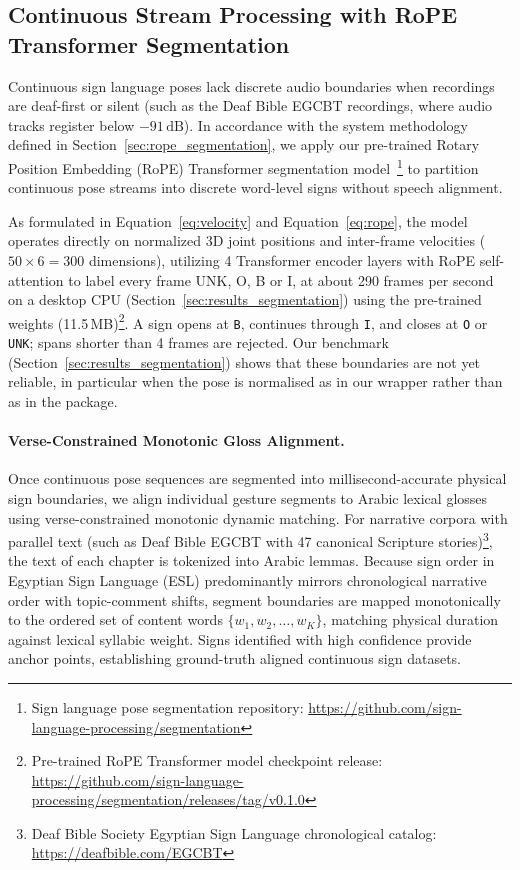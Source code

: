 \subsection{Continuous Stream Processing with RoPE Transformer Segmentation}
Continuous sign language poses lack discrete audio boundaries when recordings are deaf-first or silent (such as the Deaf Bible EGCBT recordings, where audio tracks register below $-91\,\text{dB}$). In accordance with the system methodology defined in Section~\ref{sec:rope_segmentation}, we apply our pre-trained Rotary Position Embedding (RoPE) Transformer segmentation model~\cite{signsegmentation}\footnote{Sign language pose segmentation repository: \url{https://github.com/sign-language-processing/segmentation}} to partition continuous pose streams into discrete word-level signs without speech alignment.

As formulated in Equation~\eqref{eq:velocity} and Equation~\eqref{eq:rope}, the model operates directly on normalized 3D joint positions and inter-frame velocities ($50 \times 6 = 300$ dimensions), utilizing 4 Transformer encoder layers with RoPE self-attention to label every frame UNK, O, B or I, at about 290 frames per second on a desktop CPU (Section~\ref{sec:results_segmentation}) using the pre-trained  weights (11.5\,MB)\footnote{Pre-trained RoPE Transformer model checkpoint release: \url{https://github.com/sign-language-processing/segmentation/releases/tag/v0.1.0}}. A sign opens at \texttt{B}, continues through \texttt{I}, and closes at \texttt{O} or \texttt{UNK}; spans shorter than 4 frames are rejected. Our benchmark (Section~\ref{sec:results_segmentation}) shows that these boundaries are not yet reliable, in particular when the pose is normalised as in our wrapper rather than as in the package.

\paragraph{Verse-Constrained Monotonic Gloss Alignment.}
Once continuous pose sequences are segmented into millisecond-accurate physical sign boundaries, we align individual gesture segments to Arabic lexical glosses using verse-constrained monotonic dynamic matching. For narrative corpora with parallel text (such as Deaf Bible EGCBT with 47 canonical Scripture stories)\footnote{Deaf Bible Society Egyptian Sign Language chronological catalog: \url{https://deafbible.com/EGCBT}}, the text of each chapter is tokenized into Arabic lemmas. Because sign order in Egyptian Sign Language (ESL) predominantly mirrors chronological narrative order with topic-comment shifts, segment boundaries are mapped monotonically to the ordered set of content words $\{w_1, w_2, \dots, w_K\}$, matching physical duration against lexical syllabic weight. Signs identified with high confidence provide anchor points, establishing ground-truth aligned continuous sign datasets.

